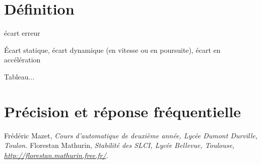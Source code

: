 \documentclass[10pt,fleqn]{article} %
\begin{document}

\setlength{\columnseprule}{.1pt}

\vspace{2cm}
\pagestyle{fancy}
\thispagestyle{plain}
\section{Définition}
\begin{defi}
écart erreur
\end{defi}

\begin{defi}
Écart statique, écart dynamique (en vitesse ou en poursuite), écart en accélération
\end{defi}

\begin{methode}

\end{methode}

\begin{methode}

\end{methode}

\begin{resultat}
Tableau...
\end{resultat}
\section{Précision et réponse fréquentielle}


\begin{thebibliography}{2}
    Frédéric Mazet, {\it Cours d'automatique de deuxième année, Lycée Dumont Durville, Toulon.}
       Florestan Mathurin, {\it Stabilité des SLCI, Lycée Bellevue, Toulouse, \url{http://florestan.mathurin.free.fr/}.}



\end{thebibliography}
\end{document}
